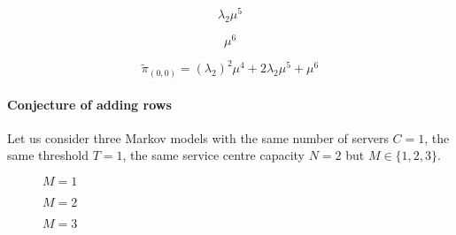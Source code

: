 \newpage

\begin{multicols}{4}
    \begin{figure}[H]
        \centering
        \scalebox{0.48}{
            }
    \end{figure}
    \vspace*{\fill}
    \columnbreak
    \begin{equation*}
        \lambda_2 \mu^5
    \end{equation*}
    \vspace*{\fill}
    \columnbreak
    \begin{figure}[H]
        \centering
        \scalebox{0.48}{
            }
    \end{figure}
    \vspace*{\fill}
    \columnbreak
    \begin{equation*}
        \mu^6
    \end{equation*}
\end{multicols}


\begin{equation*}
    \tilde{\pi}_{(0,0)} = (\lambda_2)^2 \mu^4 + 2 \lambda_2 \mu^5 + \mu^6
\end{equation*}

\paragraph{Conjecture of adding rows}

Let us consider three Markov models with the same number of servers \(C=1\), 
the same threshold \(T=1\), the same service centre capacity \(N=2\) but 
\(M\in\{1, 2, 3\}\).


\begin{multicols}{3}
    \begin{figure}[H]
        \centering
        \scalebox{0.65}{
            }
        \caption{\(M=1\)}
    \end{figure}
    \columnbreak
    \begin{figure}[H]
        \centering
        \scalebox{0.65}{
            }
        \caption{\(M=2\)}
    \end{figure}
    \begin{figure}[H]
        \centering
        \scalebox{0.65}{
            }
        \caption{\(M=3\)}
    \end{figure}
\end{multicols}

